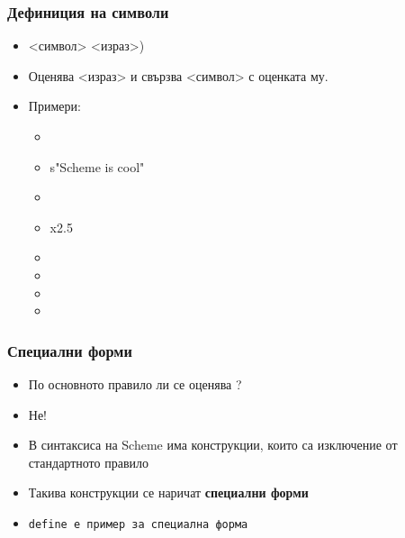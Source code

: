 \documentclass{beamer}
\begin{document}
\begin{frame}
  \frametitle{Дефиниция на символи}

  \begin{itemize}[<+->]
  \item {} <символ> <израз>\tta)
  \item Оценява <израз> и свързва <символ> с оценката му.
  \item Примери:
    \begin{itemize}
    \item {}
    \item \evalsto s{"Scheme is cool"}
    \item {}
    \item \evalsto x{2.5}
    \item {}
    \item {}
    \item {}
    \item {}
    \end{itemize}
  \end{itemize}
\end{frame}

\begin{frame}
  \frametitle{Специални форми}

  \begin{itemize}[<+->]
  \item По основното правило ли се оценява ?
  \item \alert{Не!}
  \item В синтаксиса на Scheme има конструкции, които са изключение от стандартното правило
  \item Такива конструкции се наричат \textbf{специални форми}
  \item \tt{define} е пример за специална форма
  \end{itemize}
\end{frame}
\end{document}

